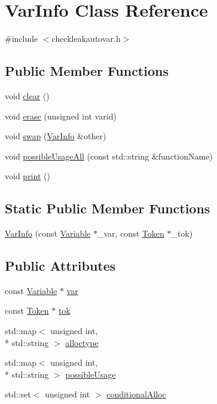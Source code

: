 \hypertarget{struct_var_info}{\section{Var\-Info Class Reference}
\label{struct_var_info}
}


{\ttfamily \#include $<$checkleakautovar.\-h$>$}

\subsection*{Public Member Functions}
\begin{DoxyCompactItemize}
\item 
void \hyperlink{struct_var_info_a3701bf050dde0d35152d6c3289d7e11b}{clear} ()
\item 
void \hyperlink{struct_var_info_a36794477ee2794cf360e0ef84944c787}{erase} (unsigned int varid)
\item 
void \hyperlink{struct_var_info_a73a909a1ef8aa7ebfa0df40e276570cd}{swap} (\hyperlink{struct_var_info}{Var\-Info} \&other)
\item 
void \hyperlink{struct_var_info_a06af2ee4f70d1d94eb4edfaac8f10dac}{possible\-Usage\-All} (const std\-::string \&function\-Name)
\item 
void \hyperlink{struct_var_info_a331135fef9dccf939ebe5a8aed3eb2bd}{print} ()
\end{DoxyCompactItemize}
\subsection*{Static Public Member Functions}
\begin{DoxyCompactItemize}
\item 
\hyperlink{struct_var_info_a3db362566db570920c38c1bc9be249e0}{Var\-Info} (const \hyperlink{class_variable}{Variable} $\ast$\-\_\-var, const \hyperlink{class_token}{Token} $\ast$\-\_\-tok)
\end{DoxyCompactItemize}
\subsection*{Public Attributes}
\begin{DoxyCompactItemize}
\item 
const \hyperlink{class_variable}{Variable} $\ast$ \hyperlink{struct_var_info_a68f990f51837a325f0bfd4f5a3949544}{var}
\item 
const \hyperlink{class_token}{Token} $\ast$ \hyperlink{struct_var_info_a456137087f9faf26f7b341d62ad750fe}{tok}
\item 
std\-::map$<$ unsigned int, \\*
std\-::string $>$ \hyperlink{struct_var_info_ab6d199ca44022965783d21f23f42fd2d}{alloctype}
\item 
std\-::map$<$ unsigned int, \\*
std\-::string $>$ \hyperlink{struct_var_info_a1a9a7e930ba84c3b398df50094126689}{possible\-Usage}
\item 
std\-::set$<$ unsigned int $>$ \hyperlink{struct_var_info_ab482810e8ba232b2e40899e128cfdc98}{conditional\-Alloc}
\end{DoxyCompactItemize}


